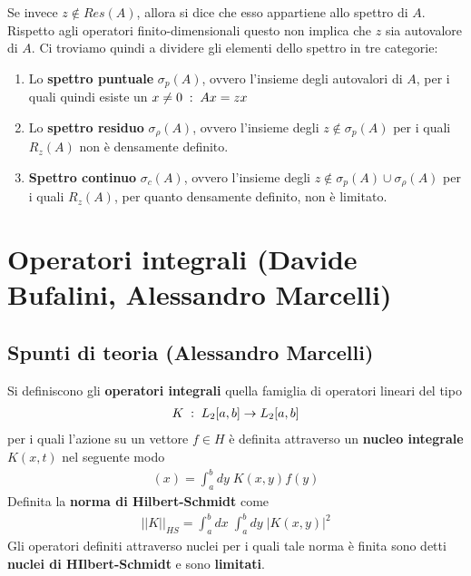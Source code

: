 Se invece $z \notin Res(A)$, allora si dice che esso appartiene allo spettro di $A$.
Rispetto agli operatori finito-dimensionali questo non implica che $z$ sia autovalore di $A$. Ci troviamo quindi a dividere gli elementi dello spettro in tre categorie:
\begin{enumerate}
	\item Lo \textbf{spettro puntuale} $\sigma_p(A)$, ovvero l'insieme degli autovalori di $A$, per i quali quindi esiste un $x \neq 0 \; : \; Ax = zx$
	 
	\item Lo \textbf{spettro residuo} $\sigma_\rho(A)$, ovvero l'insieme degli $z\notin \sigma_p(A)$ per i quali $R_z(A)$ non è densamente definito.
	
	\item \textbf{Spettro continuo} $\sigma_c(A)$, ovvero l'insieme degli $z\notin \sigma_p(A) \cup \sigma_\rho (A)$  per i quali $R_z(A)$, per quanto densamente definito, non è limitato.
\end{enumerate}

\newpage

\section{Operatori integrali (Davide Bufalini, Alessandro Marcelli)}

\subsection{Spunti di teoria (Alessandro Marcelli)}

Si definiscono gli \textbf{operatori integrali} quella famiglia di operatori lineari del tipo
\begin{align}
	K \; : \; L_2 [a,b] \rightarrow L_2 [a,b] 
\end{align}
per i quali l'azione su un vettore $f \in H$ è definita attraverso un \textbf{nucleo integrale} $K(x,t)$ nel seguente modo
\begin{align}
	[Kf](x) =  \int_{a}^{b} dy \; K(x,y) f(y)  
\end{align}
Definita la \textbf{norma di Hilbert-Schmidt} come
\begin{align}
	||K||_{HS} =\int_{a}^{b} dx \; \int_{a}^{b} dy \; |K(x,y)|^2
\end{align}
Gli operatori definiti attraverso nuclei per i quali tale norma è finita sono detti \textbf{nuclei di HIlbert-Schmidt} e sono \textbf{limitati}.

